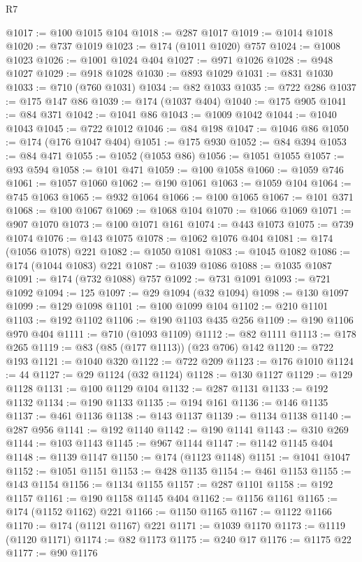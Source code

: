 \begin{lexlean}{R7}
\begin{coremodule}
@1017 := @100 @1015 @104
@1018 := @287 @1017
@1019 := @1014 @1018
@1020 := @737 @1019
@1023 := @174 (@1011 @1020) @757
@1024 := @1008 @1023
@1026 := @1001 @1024 @404
@1027 := @971 @1026
@1028 := @948 @1027
@1029 := @918 @1028
@1030 := @893 @1029
@1031 := @831 @1030
@1033 := @710 (@760 @1031)
@1034 := @82 @1033
@1035 := @722 @286
@1037 := @175 @147 @86
@1039 := @174 (@1037 @404)
@1040 := @175 @905
@1041 := @84 @371
@1042 := @1041 @86
@1043 := @1009 @1042
@1044 := @1040 @1043
@1045 := @722 @1012
@1046 := @84 @198
@1047 := @1046 @86
@1050 := @174 (@176 @1047 @404)
@1051 := @175 @930
@1052 := @84 @394
@1053 := @84 @471
@1055 := @1052 (@1053 @86)
@1056 := @1051 @1055
@1057 := @93 @594
@1058 := @101 @471
@1059 := @100 @1058
@1060 := @1059 @746
@1061 := @1057 @1060
@1062 := @190 @1061
@1063 := @1059 @104
@1064 := @745 @1063
@1065 := @932 @1064
@1066 := @100 @1065
@1067 := @101 @371
@1068 := @100 @1067
@1069 := @1068 @104
@1070 := @1066 @1069
@1071 := @907 @1070
@1073 := @100 @1071 @161
@1074 := @443 @1073
@1075 := @739 @1074
@1076 := @143 @1075
@1078 := @1062 @1076 @404
@1081 := @174 (@1056 @1078) @221
@1082 := @1050 @1081
@1083 := @1045 @1082
@1086 := @174 (@1044 @1083) @221
@1087 := @1039 @1086
@1088 := @1035 @1087
@1091 := @174 (@732 @1088) @757
@1092 := @731 @1091
@1093 := @721 @1092
@1094 := 125
@1097 := @29 @1094 (@32 @1094)
@1098 := @130 @1097
@1099 := @129 @1098
@1101 := @100 @1099 @104
@1102 := @210 @1101
@1103 := @192 @1102
@1106 := @190 @1103 @435 @256
@1109 := @190 @1106 @970 @404
@1111 := @710 (@1093 @1109)
@1112 := @82 @1111
@1113 := @178 @265
@1119 := @83 (@85 (@177 @1113)) (@23 @706) @142
@1120 := @722 @193
@1121 := @1040 @320
@1122 := @722 @209
@1123 := @176 @1010
@1124 := 44
@1127 := @29 @1124 (@32 @1124)
@1128 := @130 @1127
@1129 := @129 @1128
@1131 := @100 @1129 @104
@1132 := @287 @1131
@1133 := @192 @1132
@1134 := @190 @1133
@1135 := @194 @161
@1136 := @146 @1135
@1137 := @461 @1136
@1138 := @143 @1137
@1139 := @1134 @1138
@1140 := @287 @956
@1141 := @192 @1140
@1142 := @190 @1141
@1143 := @310 @269
@1144 := @103 @1143
@1145 := @967 @1144
@1147 := @1142 @1145 @404
@1148 := @1139 @1147
@1150 := @174 (@1123 @1148)
@1151 := @1041 @1047
@1152 := @1051 @1151
@1153 := @428 @1135
@1154 := @461 @1153
@1155 := @143 @1154
@1156 := @1134 @1155
@1157 := @287 @1101
@1158 := @192 @1157
@1161 := @190 @1158 @1145 @404
@1162 := @1156 @1161
@1165 := @174 (@1152 @1162) @221
@1166 := @1150 @1165
@1167 := @1122 @1166
@1170 := @174 (@1121 @1167) @221
@1171 := @1039 @1170
@1173 := @1119 (@1120 @1171)
@1174 := @82 @1173
@1175 := @240 @17
@1176 := @1175 @22
@1177 := @90 @1176

\end{coremodule}
\end{lexlean}
